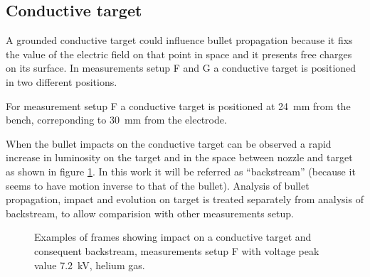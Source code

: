\subsection{Conductive target}
A grounded conductive target could influence bullet propagation because it fixs the value of the electric field on that point in space and it presents free charges on its surface.
In measurements setup F and G a conductive target is positioned in two different positions.

For measurement setup F a conductive target is positioned at \SI{24}{\milli\meter} from the bench, correponding to \SI{30}{\milli\meter} from the electrode. 

When the bullet impacts on the conductive target can be observed a rapid increase in luminosity on the target and in the space between nozzle and target as shown in figure \ref{fig:elio_met}. In this work it will be referred as ``backstream'' (because it seems to have motion inverse to that of the bullet). Analysis of bullet propagation, impact and evolution on target is treated separately from analysis of backstream, to allow comparision with other measurements setup.
\begin{figure}
 \centering
 
 
 \caption{Examples of frames showing impact on a conductive target and consequent backstream, measurements setup F with voltage peak value \SI{7.2}{\kilo\volt}, helium gas.}
 \label{fig:elio_met}
\end{figure}


